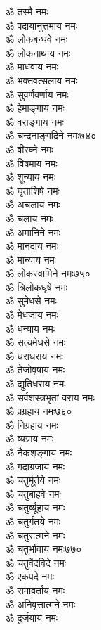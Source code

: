 \begin{center}
\begin{multicols}{2}
\begin{flushleft}
ॐ तस्मै नमः\\
ॐ पदायानुत्तमाय नमः\\
ॐ लोकबन्धवे नमः\\
ॐ लोकनाथाय नमः\\
ॐ माधवाय नमः\\
ॐ भक्तवत्सलाय नमः\\
ॐ सुवर्णवर्णाय नमः\\
ॐ हेमाङ्गाय नमः\\
ॐ वराङ्गाय नमः\\
ॐ चन्दनाङ्गदिने नमः\hfill ७४०\\
ॐ वीरघ्ने नमः\\
ॐ विषमाय नमः\\
ॐ शून्याय नमः\\
ॐ घृताशिषे नमः\\
ॐ अचलाय नमः\\
ॐ चलाय नमः\\
ॐ अमानिने नमः\\
ॐ मानदाय नमः\\
ॐ मान्याय नमः\\
ॐ लोकस्वामिने नमः\hfill ७५०\\
ॐ त्रिलोकधृषे नमः\\
ॐ सुमेधसे नमः\\
ॐ मेधजाय नमः\\
ॐ धन्याय नमः\\
ॐ सत्यमेधसे नमः\\
ॐ धराधराय नमः\\
ॐ तेजोवृषाय नमः\\
ॐ द्युतिधराय नमः\\
ॐ सर्वशस्त्रभृतां वराय नमः\\
ॐ प्रग्रहाय नमः\hfill ७६०\\
ॐ निग्रहाय नमः\\
ॐ व्यग्राय नमः\\
ॐ नैकशृङ्गाय नमः\\
ॐ गदाग्रजाय नमः\\
ॐ चतुर्मूर्तये नमः\\
ॐ चतुर्बाहवे नमः\\
ॐ चतुर्व्यूहाय नमः\\
ॐ चतुर्गतये नमः\\
ॐ चतुरात्मने नमः\\
ॐ चतुर्भावाय नमः\hfill ७७०\\
ॐ चतुर्वेदविदे नमः\\
ॐ एकपदे नमः\\
ॐ समावर्ताय नमः\\
ॐ अनिवृत्तात्मने नमः\\
ॐ दुर्जयाय नमः\\

\end{flushleft}
\end{multicols}
\end{center}
